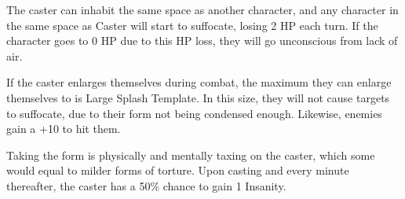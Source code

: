 \documentclass[11pt,a4paper,twocolumn]{book}
\begin{document}
The caster can inhabit the same space as another character, and any character in the same space as Caster will start to suffocate, losing 2 HP each turn. If the character goes to 0 HP due to this HP loss, they will go unconscious from lack of air.

If the caster enlarges themselves during combat, the maximum they can enlarge themselves to is Large Splash Template. In this size, they will not cause targets to suffocate, due to their form not being condensed enough. Likewise, enemies gain a +10 to hit them.

Taking the form is physically and mentally taxing on the caster, which some would equal to milder forms of torture. Upon casting and every minute thereafter, the caster has a 50\% chance to gain 1 Insanity.

%	
%
%
%
\end{document}
